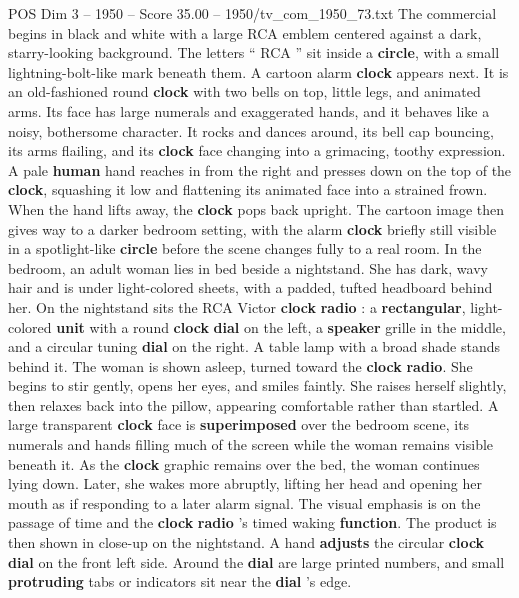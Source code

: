 \begin{textsample}{POS Dim 3 – 1950 – Score 35.00 – 1950/tv\_com\_1950\_73.txt}  \label{ex:f3_pos_001}
The commercial begins in black and white with a large RCA emblem centered against a dark, starry-looking background.
The letters “ RCA ” sit inside a \textbf{circle}, with a small lightning-bolt-like mark beneath them.
A cartoon alarm \textbf{clock} appears next.
It is an old-fashioned round \textbf{clock} with two bells on top, little legs, and animated arms.
Its face has large numerals and exaggerated hands, and it behaves like a noisy, bothersome character.
It rocks and dances around, its bell cap bouncing, its arms flailing, and its \textbf{clock} face changing into a grimacing, toothy expression.
A pale \textbf{human} hand reaches in from the right and presses down on the top of the \textbf{clock}, squashing it low and flattening its animated face into a strained frown.
When the hand lifts away, the \textbf{clock} pops back upright.
The cartoon image then gives way to a darker bedroom setting, with the alarm \textbf{clock} briefly still visible in a spotlight-like \textbf{circle} before the scene changes fully to a real room.
In the bedroom, an adult woman lies in bed beside a nightstand.
She has dark, wavy hair and is under light-colored sheets, with a padded, tufted headboard behind her.
On the nightstand sits the RCA Victor \textbf{clock} \textbf{radio} : a \textbf{rectangular}, light-colored \textbf{unit} with a round \textbf{clock} \textbf{dial} on the left, a \textbf{speaker} grille in the middle, and a circular tuning \textbf{dial} on the right.
A table lamp with a broad shade stands behind it.
The woman is shown asleep, turned toward the \textbf{clock} \textbf{radio}.
She begins to stir gently, opens her eyes, and smiles faintly.
She raises herself slightly, then relaxes back into the pillow, appearing comfortable rather than startled.
A large transparent \textbf{clock} face is \textbf{superimposed} over the bedroom scene, its numerals and hands filling much of the screen while the woman remains visible beneath it.
As the \textbf{clock} graphic remains over the bed, the woman continues lying down.
Later, she wakes more abruptly, lifting her head and opening her mouth as if responding to a later alarm signal.
The visual emphasis is on the passage of time and the \textbf{clock} \textbf{radio} ’s timed waking \textbf{function}.
The product is then shown in close-up on the nightstand.
A hand \textbf{adjusts} the circular \textbf{clock} \textbf{dial} on the front left side.
Around the \textbf{dial} are large printed numbers, and small \textbf{protruding} tabs or indicators sit near the \textbf{dial} ’s edge.

\end{textsample}

